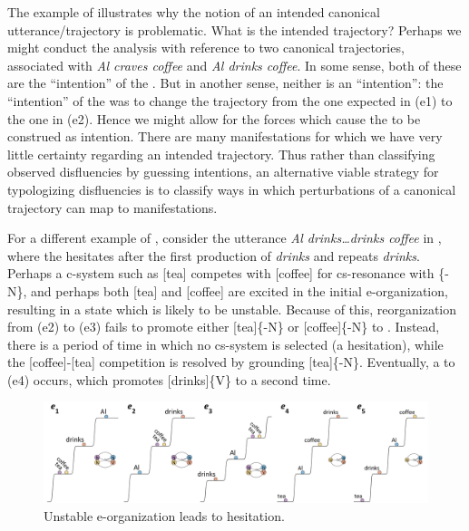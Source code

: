   The example of {} illustrates why the notion of an intended canonical utterance/trajectory is problematic. What is the intended trajectory? Perhaps we might conduct the analysis with reference to two canonical trajectories, associated with \textit{Al craves coffee} and \textit{Al drinks coffee}. In some sense, both of these are the “intention” of the . But in another sense, neither is an “intention”: the “intention” of the  was to change the trajectory from the one expected in (e1) to the one in (e2). Hence we might allow for the  forces which cause the  to be construed as intention. There are many  manifestations for which we have very little certainty regarding an intended trajectory. Thus rather than classifying observed disfluencies by guessing intentions, an alternative viable strategy for typologizing disfluencies is to classify ways in which perturbations of a canonical trajectory can map to manifestations.

  For a different example of , consider the utterance \textit{Al drinks…drinks coffee} in {}, where the  hesitates after the first production of \textit{drinks} and repeats \textit{drinks}. Perhaps a c-system such as [tea] competes with [coffee] for cs-resonance with \{-N\}, and perhaps both [tea] and [coffee] are excited in the initial e-organization, resulting in a state which is likely to be unstable. Because of this, reorganization from (e2) to (e3) fails to promote either [tea]\{-N\} or [coffee]\{-N\} to . Instead, there is a period of time in which no cs-system is selected (a hesitation), while the [coffee]-[tea] competition is resolved by grounding [tea]\{-N\}. Eventually, a  to (e4) occurs, which promotes [drinks]\{V\} to  a second time. 

  
\begin{figure}
\includegraphics[width=\textwidth]{figures/Tilsen-img61.png}
\caption{Unstable e-organization leads to hesitation.}
\label{fig:4:11}
\end{figure}
 

